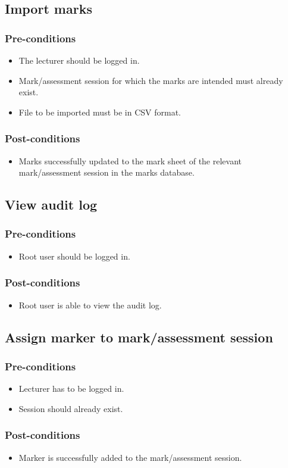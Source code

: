 \subsection{Import marks}
\subsubsection{Pre-conditions}
\begin{itemize}
\item The lecturer should be logged in.
\item Mark/assessment session for which the marks are intended must already exist.
\item File to be imported must be in CSV format.
\end{itemize}
\subsubsection{Post-conditions}
\begin{itemize}
\item Marks successfully updated to the mark sheet of the relevant mark/assessment session in the marks database.
\end{itemize}

\subsection{View audit log}
\subsubsection{Pre-conditions}
\begin{itemize}
\item Root user should be logged in.
\end{itemize}
\subsubsection{Post-conditions}
\begin{itemize}
\item Root user is able to view the audit log.
\end{itemize}

\subsection{Assign marker to mark/assessment session}
\subsubsection{Pre-conditions}
\begin{itemize}
\item Lecturer has to be logged in.
\item Session should already exist.
\end{itemize}
\subsubsection{Post-conditions}
\begin{itemize}
\item Marker is successfully added to the mark/assessment session.
\end{itemize}